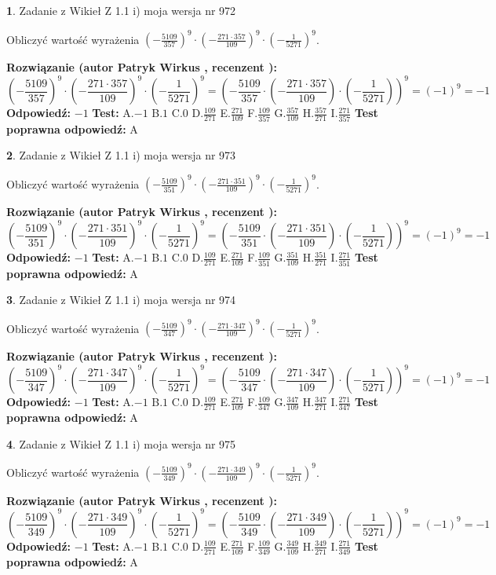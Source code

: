 \documentclass[12pt, a4paper]{article}
\theoremstyle{definition} %
\newtheorem{zad}{}
\newcommand{\zadStart}[1]{\begin{zad}#1\newline}
\newcommand{\zadStop}{\end{zad}}
\newcommand{\rozwStart}[2]{\noindent \textbf{Rozwiązanie (autor #1 , recenzent #2): }\newline}
\newcommand{\rozwStop}{\newline}
\newcommand{\odpStart}{\noindent \textbf{Odpowiedź:}\newline}
\newcommand{\odpStop}{\newline}
\newcommand{\testStart}{\noindent \textbf{Test:}\newline}
\newcommand{\testStop}{\newline}
\newcommand{\kluczStart}{\noindent \textbf{Test poprawna odpowiedź:}\newline}
\newcommand{\kluczStop}{\newline}
\begin{document}
\zadStart{Zadanie z Wikieł Z 1.1 i) moja wersja nr 972}

Obliczyć wartość wyrażenia $(-\frac{5109}{357})^{9} \cdot (-\frac{271 \cdot 357}{109})^{9} \cdot (-\frac{1}{5271})^{9}$.
\zadStop
\rozwStart{Patryk Wirkus}{}
$$(-\frac{5109}{357})^{9} \cdot (-\frac{271 \cdot 357}{109})^{9} \cdot (-\frac{1}{5271})^{9} = (-\frac{5109}{357} \cdot (-\frac{271 \cdot 357}{109}) \cdot (-\frac{1}{5271}))^{9} = (-1)^{9} = -1$$
\rozwStop
\odpStart
$-1$
\odpStop
\testStart
A.$-1$ B.$1$ C.$0$ D.$\frac{109}{271}$ E.$\frac{271}{109}$
F.$\frac{109}{357}$ G.$\frac{357}{109}$
H.$\frac{357}{271}$
I.$\frac{271}{357}$
\testStop
\kluczStart
A
\kluczStop



\zadStart{Zadanie z Wikieł Z 1.1 i) moja wersja nr 973}

Obliczyć wartość wyrażenia $(-\frac{5109}{351})^{9} \cdot (-\frac{271 \cdot 351}{109})^{9} \cdot (-\frac{1}{5271})^{9}$.
\zadStop
\rozwStart{Patryk Wirkus}{}
$$(-\frac{5109}{351})^{9} \cdot (-\frac{271 \cdot 351}{109})^{9} \cdot (-\frac{1}{5271})^{9} = (-\frac{5109}{351} \cdot (-\frac{271 \cdot 351}{109}) \cdot (-\frac{1}{5271}))^{9} = (-1)^{9} = -1$$
\rozwStop
\odpStart
$-1$
\odpStop
\testStart
A.$-1$ B.$1$ C.$0$ D.$\frac{109}{271}$ E.$\frac{271}{109}$
F.$\frac{109}{351}$ G.$\frac{351}{109}$
H.$\frac{351}{271}$
I.$\frac{271}{351}$
\testStop
\kluczStart
A
\kluczStop



\zadStart{Zadanie z Wikieł Z 1.1 i) moja wersja nr 974}

Obliczyć wartość wyrażenia $(-\frac{5109}{347})^{9} \cdot (-\frac{271 \cdot 347}{109})^{9} \cdot (-\frac{1}{5271})^{9}$.
\zadStop
\rozwStart{Patryk Wirkus}{}
$$(-\frac{5109}{347})^{9} \cdot (-\frac{271 \cdot 347}{109})^{9} \cdot (-\frac{1}{5271})^{9} = (-\frac{5109}{347} \cdot (-\frac{271 \cdot 347}{109}) \cdot (-\frac{1}{5271}))^{9} = (-1)^{9} = -1$$
\rozwStop
\odpStart
$-1$
\odpStop
\testStart
A.$-1$ B.$1$ C.$0$ D.$\frac{109}{271}$ E.$\frac{271}{109}$
F.$\frac{109}{347}$ G.$\frac{347}{109}$
H.$\frac{347}{271}$
I.$\frac{271}{347}$
\testStop
\kluczStart
A
\kluczStop



\zadStart{Zadanie z Wikieł Z 1.1 i) moja wersja nr 975}

Obliczyć wartość wyrażenia $(-\frac{5109}{349})^{9} \cdot (-\frac{271 \cdot 349}{109})^{9} \cdot (-\frac{1}{5271})^{9}$.
\zadStop
\rozwStart{Patryk Wirkus}{}
$$(-\frac{5109}{349})^{9} \cdot (-\frac{271 \cdot 349}{109})^{9} \cdot (-\frac{1}{5271})^{9} = (-\frac{5109}{349} \cdot (-\frac{271 \cdot 349}{109}) \cdot (-\frac{1}{5271}))^{9} = (-1)^{9} = -1$$
\rozwStop
\odpStart
$-1$
\odpStop
\testStart
A.$-1$ B.$1$ C.$0$ D.$\frac{109}{271}$ E.$\frac{271}{109}$
F.$\frac{109}{349}$ G.$\frac{349}{109}$
H.$\frac{349}{271}$
I.$\frac{271}{349}$
\testStop
\kluczStart
A
\kluczStop
\end{document}
